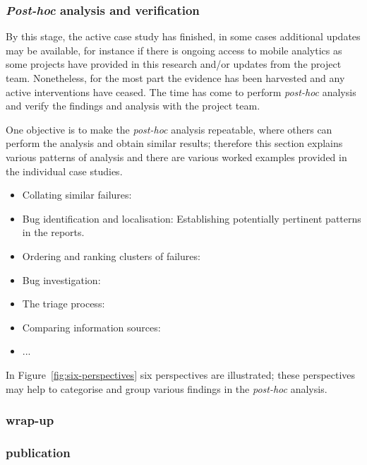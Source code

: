 \subsubsection{\emph{Post-hoc} analysis and verification}
By this stage, the active case study has finished, in some cases additional updates may be available, for instance if there is ongoing access to mobile analytics as some projects have provided in this research and/or updates from the project team. Nonetheless, for the most part the evidence has been harvested and any active interventions have ceased. The time has come to perform \emph{post-hoc} analysis and verify the findings and analysis with the project team. 

One objective is to make the \emph{post-hoc} analysis repeatable, where others can perform the analysis and obtain similar results; therefore this section explains various patterns of analysis and there are various worked examples provided in the individual case studies.

\begin{itemize}
    \item Collating similar failures:
    \item Bug identification and localisation: Establishing potentially pertinent patterns in the reports.
    \item Ordering and ranking clusters of failures:
    \item Bug investigation:
    \item The triage process: 
    \item Comparing information sources:
    \item ...
\end{itemize}

In Figure~\ref{fig:six-perspectives} six perspectives are illustrated; these perspectives may help to categorise and group various findings in the \textit{post-hoc} analysis. 



\subsubsection{wrap-up}

\subsubsection{publication}


